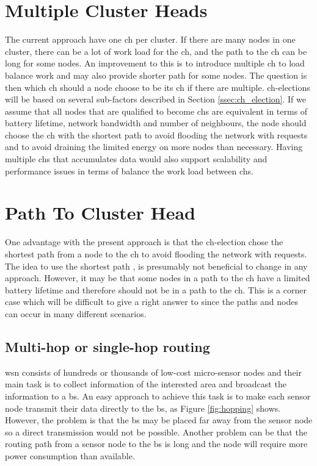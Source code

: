 \documentclass[USenglish]{uit-thesis}
\begin{document}
\section{Multiple Cluster Heads} \label{disc:multi_ch}
The current approach have one \gls{ch} per cluster. If there are many nodes in one cluster, there can be a lot of work load for the \gls{ch}, and the path to the \gls{ch} can be long for some nodes.
An improvement to this is to introduce multiple \gls{ch} to load balance work and may also provide shorter path for some nodes. The question is then which \gls{ch} should a node choose to be its \gls{ch} if there are multiple. \gls{ch}-elections will be based on several sub-factors described in Section \ref{ssec:ch_election}. If we assume that all nodes that are qualified to become \glspl{ch} are equivalent in terms of battery lifetime, network bandwidth and number of neighbours, the node should choose the \gls{ch} with the shortest path to avoid flooding the network with requests and to avoid draining the limited energy on more nodes than necessary. Having multiple \glspl{ch} that accumulates data would also support scalability and performance issues in terms of balance the work load between \glspl{ch}.


\section{Path To Cluster Head} \label{disc:ch_path}
One advantage with the present approach is that the \gls{ch}-election chose the shortest path from a node to the \gls{ch} to avoid flooding the network with requests. The idea to use the shortest path \cite{dijkstra}, is presumably not beneficial to change in any approach. However, it may be that some nodes in a path to the \gls{ch} have a limited battery lifetime and therefore should not be in a path to the \gls{ch}. This is a corner case which will be difficult to give a right answer to since the paths and nodes can occur in many different scenarios.



\subsection{Multi-hop or single-hop routing} \label{disc:hopping}

\gls{wsn} consists of hundreds or thousands of low-cost micro-sensor nodes and their main task is to collect information of the interested area and broadcast the information to a \gls{bs}. An easy approach to achieve this task is to make each sensor node transmit their data directly to the \gls{bs}, as Figure \ref{fig:hopping} shows. However, the problem is that the \gls{bs} may be placed far away from the sensor node so a direct transmission would not be possible. Another problem can be that the routing path from a sensor node to the \gls{bs} is long and the node will require more power consumption than available.
\end{document}
